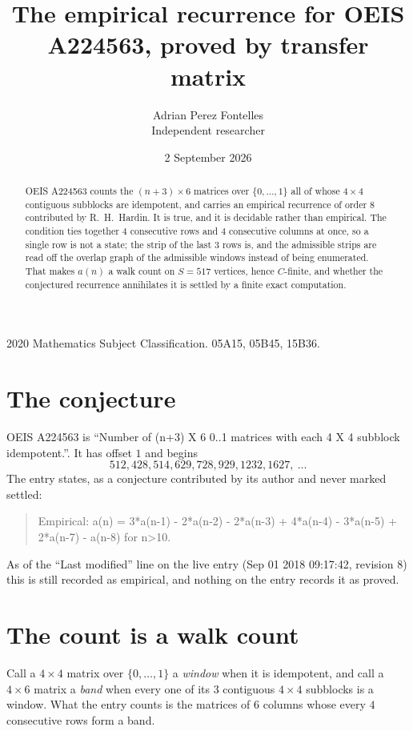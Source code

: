 \documentclass[11pt,a4paper]{article}
\title{The empirical recurrence for OEIS A224563, proved by transfer matrix}
\author{Adrian Perez Fontelles\\ \small Independent researcher}
\date{2 September 2026}
\theoremstyle{plain}
\theoremstyle{definition}
\begin{document}
\maketitle

\begin{abstract}
OEIS A224563 counts the $(n+3)\times6$ matrices over $\{0,\dots,1\}$ all of whose
$4\times4$ contiguous subblocks are idempotent, and carries an empirical recurrence of order
$8$ contributed by R.~H.~Hardin. It is true, and it is decidable rather than empirical.
The condition ties together $4$ consecutive rows and $4$ consecutive columns at once, so a
single row is not a state; the strip of the last $3$ rows is, and the admissible strips
are read off the overlap graph of the admissible windows instead of being enumerated. That
makes $a(n)$ a walk count on $S=517$ vertices, hence $C$-finite, and whether the conjectured
recurrence annihilates it is settled by a finite exact computation.
\end{abstract}

\noindent\small 2020 Mathematics Subject Classification. 05A15, 05B45, 15B36.\normalsize

\section{The conjecture}

OEIS A224563 is ``Number of (n+3) X 6 0..1 matrices with each 4 X 4 subblock idempotent.''. It has offset $1$ and begins
\[
512, 428, 514, 629, 728, 929, 1232, 1627,\ \dots
\]
The entry states, as a conjecture contributed by its author and never marked settled:
\begin{quote}
Empirical: a(n) = 3*a(n-1) - 2*a(n-2) - 2*a(n-3) + 4*a(n-4) - 3*a(n-5) + 2*a(n-7) - a(n-8) for n>10.
\end{quote}
As of the ``Last modified'' line on the live entry (Sep 01 2018 09:17:42, revision 8) this is still
recorded as empirical, and nothing on the entry records it as proved.

\section{The count is a walk count}

Call a $4\times4$ matrix over $\{0,\dots,1\}$ a \emph{window} when it is idempotent, and
call a $4\times6$ matrix a \emph{band} when every one of its $3$ contiguous
$4\times4$ subblocks is a window. What the entry counts is the matrices of $6$ columns
whose every $4$ consecutive rows form a band.
\end{document}
